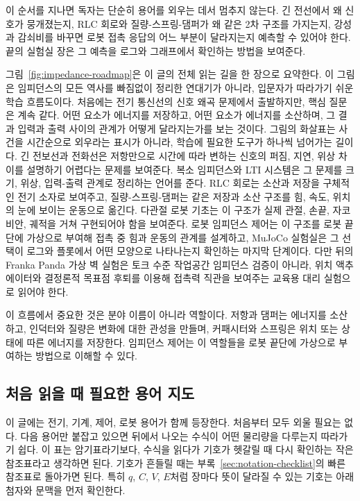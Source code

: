 이 순서를 지나면 독자는 단순히 용어를 외우는 데서 멈추지 않는다.
긴 전선에서 왜 신호가 뭉개졌는지, RLC 회로와 질량-스프링-댐퍼가 왜 같은 2차 구조를 가지는지, 강성과 감쇠비를 바꾸면 로봇 접촉 응답의 어느 부분이 달라지는지 예측할 수 있어야 한다.
끝의 실험실 장은 그 예측을 로그와 그래프에서 확인하는 방법을 보여준다.

그림~\ref{fig:impedance-roadmap}은 이 글의 전체 읽는 길을 한 장으로 요약한다.
이 그림은 임피던스의 모든 역사를 빠짐없이 정리한 연대기가 아니라, 입문자가 따라가기 쉬운 학습 흐름도이다.
처음에는 전기 통신선의 신호 왜곡 문제에서 출발하지만, 핵심 질문은 계속 같다.
어떤 요소가 에너지를 저장하고, 어떤 요소가 에너지를 소산하며, 그 결과 입력과 출력 사이의 관계가 어떻게 달라지는가를 보는 것이다.
그림의 화살표는 사건을 시간순으로 외우라는 표시가 아니라, 학습에 필요한 도구가 하나씩 넘어가는 길이다.
긴 전보선과 전화선은 저항만으로 시간에 따라 변하는 신호의 퍼짐, 지연, 위상 차이를 설명하기 어렵다는 문제를 보여준다.
복소 임피던스와 LTI 시스템은 그 문제를 크기, 위상, 입력-출력 관계로 정리하는 언어를 준다.
RLC 회로는 소산과 저장을 구체적인 전기 소자로 보여주고, 질량-스프링-댐퍼는 같은 저장과 소산 구조를 힘, 속도, 위치의 눈에 보이는 운동으로 옮긴다.
다관절 로봇 기초는 이 구조가 실제 관절, 손끝, 자코비안, 궤적을 거쳐 구현되어야 함을 보여준다.
로봇 임피던스 제어는 이 구조를 로봇 끝단에 가상으로 부여해 접촉 중 힘과 운동의 관계를 설계하고, MuJoCo 실험실은 그 선택이 로그와 플롯에서 어떤 모양으로 나타나는지 확인하는 마지막 단계이다.
다만 뒤의 Franka Panda 가상 벽 실험은 토크 수준 작업공간 임피던스 검증이 아니라, 위치 액추에이터와 결정론적 목표점 후퇴를 이용해 접촉력 직관을 보여주는 교육용 대리 실험으로 읽어야 한다.



이 흐름에서 중요한 것은 분야 이름이 아니라 역할이다.
저항과 댐퍼는 에너지를 소산하고, 인덕터와 질량은 변화에 대한 관성을 만들며, 커패시터와 스프링은 위치 또는 상태에 따른 에너지를 저장한다.
임피던스 제어는 이 역할들을 로봇 끝단에 가상으로 부여하는 방법으로 이해할 수 있다.

\subsection{처음 읽을 때 필요한 용어 지도}

이 글에는 전기, 기계, 제어, 로봇 용어가 함께 등장한다.
처음부터 모두 외울 필요는 없다.
다음 용어만 붙잡고 있으면 뒤에서 나오는 수식이 어떤 물리량을 다루는지 따라가기 쉽다.
이 표는 암기표라기보다, 수식을 읽다가 기호가 헷갈릴 때 다시 확인하는 작은 참조표라고 생각하면 된다.
기호가 흔들릴 때는 부록~\ref{sec:notation-checklist}의 빠른 참조표로 돌아가면 된다.
특히 $q$, $C$, $V$, $E$처럼 장마다 뜻이 달라질 수 있는 기호는 아래첨자와 문맥을 먼저 확인한다.

